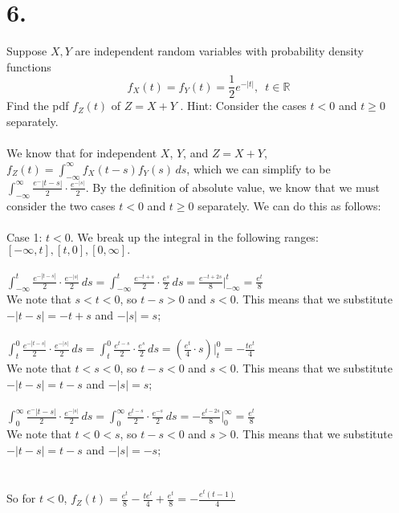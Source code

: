 \documentclass{article}
\begin{document}
\section*{6.}
{\Large 
Suppose $X, Y$  are independent random variables with probability density functions
\[f_X (t) = f_Y (t) =\frac12e^{-|t|}, \,\,\, t \in \mathbb R\]
Find the pdf $f_Z (t)$ of $Z = X + Y$ . Hint: Consider the cases $t < 0$ and $t \ge 0$ separately. \\ \\ 
We know that for independent $X$, $Y$, and $Z = X + Y$, $f_Z(t) = \int_{-\infty}^{\infty}f_X(t - s)f_Y(s) \,ds$, which we can simplify to be $\int_{-\infty}^{\infty} \frac{e^-{|t-s|}}{2} \cdot \frac{e^{-|s|}}{2}$. By the definition of absolute value, we know that we must consider the two cases $t < 0$ and $t \geq 0$ separately. We can do this as follows: \\ \\ 
Case 1: $t < 0$. We break up the integral in the following ranges: $[-\infty, t], [t, 0], [0, \infty].$ \\ \\
$\int_{-\infty}^{t} \frac{e^{-|t-s|}}{2} \cdot \frac{e^{-|s|}}{2} \,ds = \int_{-\infty}^{t} \frac{e^{-t+s}}{2} \cdot \frac{e^{s}}{2} \,ds = \frac{e^{-t + 2s}}{8} |_{-\infty}^{t} = \frac{e^{t}}{8}$ \\ 
We note that $s < t < 0$, so $t - s > 0$ and $s < 0$. This means that we substitute $-|t-s| = -t + s$ and $-|s| = s$; \\ \\ 
$\int_{t}^{0} \frac{e^{-|t-s|}}{2} \cdot \frac{e^{-|s|}}{2} \,ds = \int_{t}^{0} \frac{e^{t-s}}{2} \cdot \frac{e^{s}}{2} \,ds = (\frac{e^{t}}{4} \cdot s) |_{t}^{0} = -\frac{te^{t}}{4}$ \\ 
We note that $t < s < 0$, so $t - s < 0$ and $s < 0$. This means that we substitute $-|t-s| = t - s$ and $-|s| = s$; \\ \\ 
$\int_{0}^{\infty} \frac{e^-{|t-s|}}{2} \cdot \frac{e^{-|s|}}{2} \,ds = \int_{0}^{\infty} \frac{e^{t-s}}{2} \cdot \frac{e^{-s}}{2} \,ds = -\frac{e^{t - 2s}}{8} |_{0}^{\infty} = \frac{e^{t}}{8}$ \\ 
We note that $t < 0 < s$, so $t - s < 0$ and $s > 0$. This means that we substitute $-|t-s| = t - s$ and $-|s| = -s$; \\  \\ \\
So for $t < 0$, $f_Z(t) = \frac{e^t}{8} - \frac{te^t}{4} + \frac{e^t}{8} = -\frac{e^t(t - 1)}{4}$
}
\end{document}
